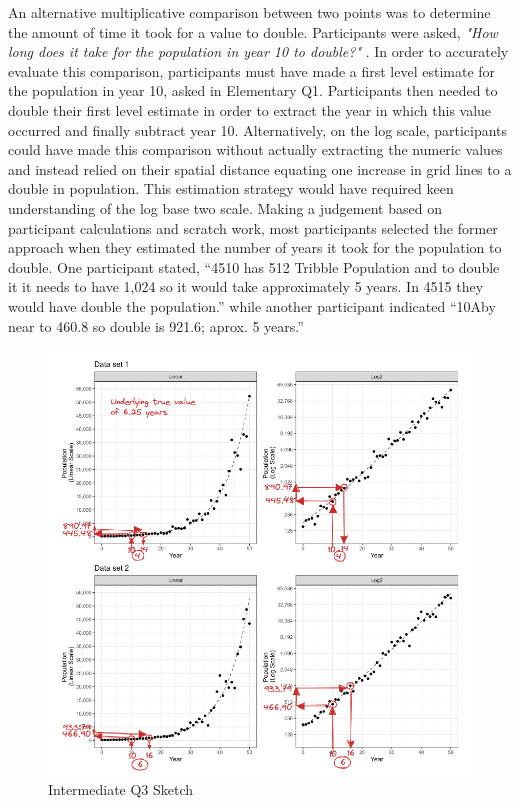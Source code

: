 \documentclass[print]{nuthesis}
\begin{document}
An alternative multiplicative comparison between two points was to determine the amount of time it took for a value to double.
Participants were asked, \textit{"How long does it take for the population in year 10 to double?"} .
In order to accurately evaluate this comparison, participants must have made a first level estimate for the population in year 10, asked in Elementary Q1.
Participants then needed to double their first level estimate in order to extract the year in which this value occurred and finally subtract year 10.
Alternatively, on the log scale, participants could have made this comparison without actually extracting the numeric values and instead relied on their spatial distance equating one increase in grid lines to a double in population.
This estimation strategy would have required keen understanding of the log base two scale.
Making a judgement based on participant calculations and scratch work, most participants selected the former approach when they estimated the number of years it took for the population to double.
One participant stated, ``4510 has 512 Tribble Population and to double it it needs to have 1,024 so it would take approximately 5 years. In 4515 they would have double the population.'' while another participant indicated ``10Aby near to 460.8 so double is 921.6; aprox. 5 years.''

\begin{figure}[tbp]

{\centering \includegraphics[width=1\linewidth,]{images/03-estimation/qi3-sketch} 

}

\caption{Intermediate Q3 Sketch}\label{fig:qi3-sketch}
\end{figure}
\end{document}
